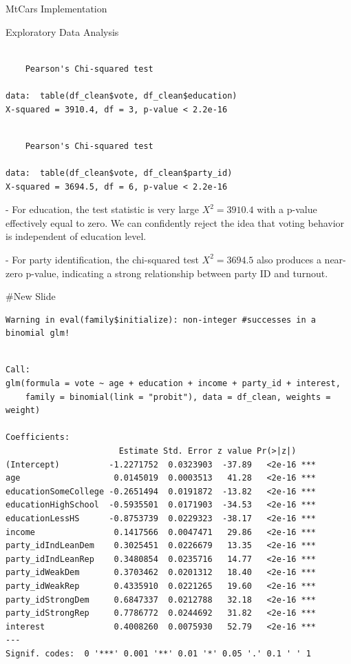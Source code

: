 \documentclass[
  ignorenonframetext,
]{beamer}
\newenvironment{Shaded}{\begin{snugshade}}{\end{snugshade}}
\newcommand{\FunctionTok}[1]{\textcolor[rgb]{0.13,0.29,0.53}{\textbf{#1}}}
\newcommand{\NormalTok}[1]{#1}
\newcommand{\SpecialCharTok}[1]{\textcolor[rgb]{0.81,0.36,0.00}{\textbf{#1}}}
\begin{document}
\begin{frame}[fragile]{MtCars Implementation}
\begin{block}{Exploratory Data Analysis}
\begin{verbatim}

    Pearson's Chi-squared test

data:  table(df_clean$vote, df_clean$education)
X-squared = 3910.4, df = 3, p-value < 2.2e-16
\end{verbatim}

\begin{Shaded}
\end{Shaded}

\begin{verbatim}

    Pearson's Chi-squared test

data:  table(df_clean$vote, df_clean$party_id)
X-squared = 3694.5, df = 6, p-value < 2.2e-16
\end{verbatim}

- For education, the test statistic is very large \(X^2 = 3910.4\) with
a p-value effectively equal to zero. We can confidently reject the idea
that voting behavior is independent of education level.

- For party identification, the chi-squared test \(X^2 = 3694.5\) also
produces a near-zero p-value, indicating a strong relationship between
party ID and turnout.

\#New Slide

\begin{verbatim}
Warning in eval(family$initialize): non-integer #successes in a binomial glm!
\end{verbatim}

\begin{verbatim}

Call:
glm(formula = vote ~ age + education + income + party_id + interest, 
    family = binomial(link = "probit"), data = df_clean, weights = weight)

Coefficients:
                       Estimate Std. Error z value Pr(>|z|)    
(Intercept)          -1.2271752  0.0323903  -37.89   <2e-16 ***
age                   0.0145019  0.0003513   41.28   <2e-16 ***
educationSomeCollege -0.2651494  0.0191872  -13.82   <2e-16 ***
educationHighSchool  -0.5935501  0.0171903  -34.53   <2e-16 ***
educationLessHS      -0.8753739  0.0229323  -38.17   <2e-16 ***
income                0.1417566  0.0047471   29.86   <2e-16 ***
party_idIndLeanDem    0.3025451  0.0226679   13.35   <2e-16 ***
party_idIndLeanRep    0.3480854  0.0235716   14.77   <2e-16 ***
party_idWeakDem       0.3703462  0.0201312   18.40   <2e-16 ***
party_idWeakRep       0.4335910  0.0221265   19.60   <2e-16 ***
party_idStrongDem     0.6847337  0.0212788   32.18   <2e-16 ***
party_idStrongRep     0.7786772  0.0244692   31.82   <2e-16 ***
interest              0.4008260  0.0075930   52.79   <2e-16 ***
---
Signif. codes:  0 '***' 0.001 '**' 0.01 '*' 0.05 '.' 0.1 ' ' 1


\end{verbatim}
\end{block}
\end{frame}
\end{document}
